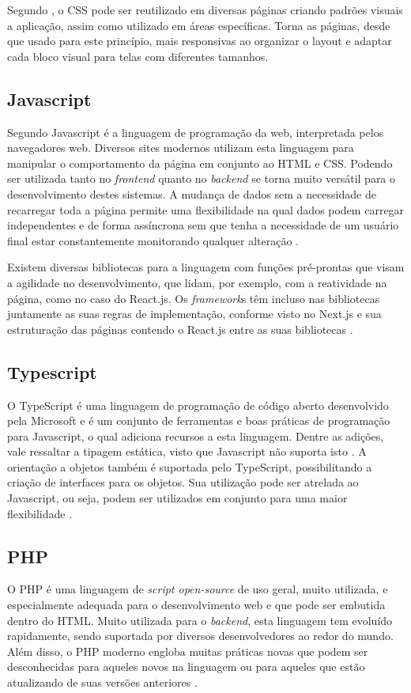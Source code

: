 Segundo , o CSS pode ser reutilizado em diversas páginas criando padrões visuais a aplicação, assim como utilizado em áreas específicas. Torna as páginas, desde que usado para este princípio, mais responsivas ao organizar o layout e adaptar cada bloco visual para telas com diferentes tamanhos.

\subsection{Javascript}
Segundo  Javascript é a linguagem de programação da web, interpretada pelos navegadores web. Diversos sites modernos utilizam esta linguagem para manipular o comportamento da página em conjunto ao HTML e CSS. Podendo ser utilizada tanto no \textit{frontend} quanto no \textit{backend} se torna muito versátil para o desenvolvimento destes sistemas. A mudança de dados sem a necessidade de recarregar toda a página permite uma flexibilidade na qual dados podem carregar independentes e de forma assíncrona sem que tenha a necessidade de um usuário final estar constantemente monitorando qualquer alteração \cite{FLANAGAN}.

Existem diversas bibliotecas para a linguagem com funções pré-prontas que visam a agilidade no desenvolvimento, que lidam, por exemplo, com a reatividade na página, como no caso do React.js. Os \textit{framework}s têm incluso nas bibliotecas juntamente as suas regras de implementação, conforme visto no Next.js e sua estruturação das páginas contendo o React.js entre as suas bibliotecas \cite{ROBBINS}.

\subsection{Typescript}
O TypeScript é uma linguagem de programação de código aberto desenvolvido pela Microsoft e é um conjunto de ferramentas e boas práticas de programação para Javascript, o qual adiciona recursos a esta linguagem. Dentre as adições, vale ressaltar a tipagem estática, visto que Javascript não suporta isto \cite{TYPESCRIPT}. A orientação a objetos também é suportada pelo TypeScript, possibilitando a criação de interfaces para os objetos. Sua utilização pode ser atrelada ao Javascript, ou seja, podem ser utilizados em conjunto para uma maior flexibilidade \cite{CHERNY}.

\subsection{PHP}
O PHP é uma linguagem de \textit{script open-source} de uso geral, muito utilizada, e especialmente adequada para o desenvolvimento web e que pode ser embutida dentro do HTML. Muito utilizada para o \textit{backend}, esta linguagem tem evoluído rapidamente, sendo suportada por diversos desenvolvedores ao redor do mundo. Além disso, o PHP moderno engloba muitas práticas novas que podem ser desconhecidas para aqueles novos na linguagem ou para aqueles que estão atualizando de suas versões anteriores \cite{LOCKHART}.

